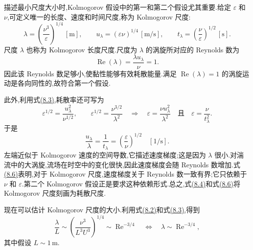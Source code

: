 \begin{note}
\label{note:kolmogorov-scale-size}
描述最小尺度大小时,Kolmogorov 假设中的第一和第二个假设尤其重要.给定 $\varepsilon$ 和 $\nu$,可定义唯一的长度、速度和时间尺度,称为 Kolmogorov 尺度:
\begin{equation}\label{eq:kolmogorov-scales}
 \lambda=\left(\frac{\nu^3}{\varepsilon}\right)^{1/4}\,[\mathrm{m}],\qquad
 u_\lambda=(\varepsilon\nu)^{1/4}\,[\mathrm{m}/\mathrm{s}],\qquad
 t_\lambda=\left(\frac{\nu}{\varepsilon}\right)^{1/2}\,[\mathrm{s}].
\end{equation}
尺度 $\lambda$ 也称为 Kolmogorov 长度尺度.尺度为 $\lambda$ 的涡旋所对应的 Reynolds 数为
\begin{equation}\label{eq:kolmogorov-reynolds-number}
 \operatorname{Re}(\lambda)=\frac{\lambda u_\lambda}{\nu}=1.
\end{equation}
因此该 Reynolds 数足够小,使黏性能够有效耗散能量.满足 $\operatorname{Re}(\lambda)=1$ 的涡旋运动是各向同性的,故符合第一个假设.

此外,利用式\hyperref[eq:kolmogorov-scales]{(8.3)},耗散率还可写为
\begin{equation}\label{eq:kolmogorov-dissipation-relations}
 \varepsilon^{1/2}=\frac{u_\lambda^2}{\nu^{1/2}},\qquad
 \varepsilon^{1/2}=\frac{\nu^{3/2}}{\lambda^2}
 \quad\Longrightarrow\quad
 \varepsilon=\frac{\nu u_\lambda^2}{\lambda^2}
 \quad\text{且}\quad
 \varepsilon=\frac{\nu}{t_\lambda^2}.
\end{equation}
于是
\begin{equation}\label{eq:kolmogorov-velocity-gradient}
 \frac{u_\lambda}{\lambda}
  =\frac{1}{t_\lambda}
  =\left(\frac{\varepsilon}{\nu}\right)^{1/2}
  \quad[1/\mathrm{s}].
\end{equation}
左端近似于 Kolmogorov 速度的空间导数,它描述速度梯度;这是因为 $\lambda$ 很小.对湍流中的大涡旋,流场在时空中的变化很快,因此速度梯度会随 Reynolds 数增加.式\hyperref[eq:kolmogorov-velocity-gradient]{(8.6)}表明,对于 Kolmogorov 尺度,速度梯度关于 Reynolds 数一致有界;它只依赖于 $\nu$ 和 $\varepsilon$.第二个 Kolmogorov 假设正是要求这种依赖形式.总之,式\hyperref[eq:kolmogorov-reynolds-number]{(8.4)}和式\hyperref[eq:kolmogorov-velocity-gradient]{(8.6)}将 Kolmogorov 尺度刻画为耗散尺度.

现在可以估计 Kolmogorov 尺度的大小.利用式\hyperref[eq:turbulent-energy-dissipation-scaling]{(8.2)}和式\hyperref[eq:kolmogorov-scales]{(8.3)},得到
\begin{equation}\label{eq:kolmogorov-length-reynolds-scaling}
 \frac{\lambda}{L}
 \sim\left(\frac{\nu^3}{L^3U^3}\right)^{1/4}
 \sim\operatorname{Re}^{-3/4}
 \quad\Longleftrightarrow\quad
 \lambda\sim\operatorname{Re}^{-3/4},
\end{equation}
其中假设 $L\sim1\,\mathrm{m}$.
\end{note}

